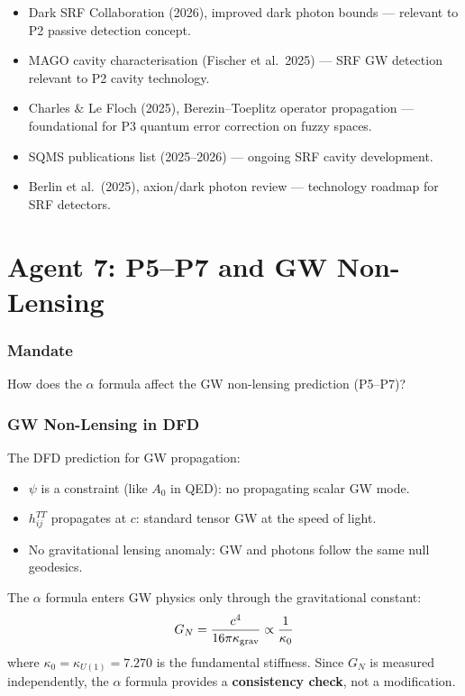 \documentclass[11pt,a4paper]{article}
\begin{document}
\begin{itemize}
\item Dark SRF Collaboration (2026), improved dark photon bounds --- relevant to P2 passive detection concept.
\item MAGO cavity characterisation (Fischer et al.\ 2025) --- SRF GW detection relevant to P2 cavity technology.
\item Charles \& Le Floch (2025), Berezin--Toeplitz operator propagation --- foundational for P3 quantum error correction on fuzzy spaces.
\item SQMS publications list (2025--2026) --- ongoing SRF cavity development.
\item Berlin et al.\ (2025), axion/dark photon review --- technology roadmap for SRF detectors.
\end{itemize}


\part{Agent 7: P5--P7 and GW Non-Lensing}
\label{part:agent7}

\section{Mandate}
How does the $\alpha$ formula affect the GW non-lensing prediction (P5--P7)?

\section{GW Non-Lensing in DFD}

The DFD prediction for GW propagation:
\begin{itemize}
\item $\psi$ is a constraint (like $A_0$ in QED): no propagating scalar GW mode.
\item $h_{ij}^{TT}$ propagates at $c$: standard tensor GW at the speed of light.
\item No gravitational lensing anomaly: GW and photons follow the same null geodesics.
\end{itemize}

The $\alpha$ formula enters GW physics only through the gravitational constant:
\begin{equation}
G_N = \frac{c^4}{16\pi\kappa_{\rm grav}} \propto \frac{1}{\kappa_0}
\end{equation}
where $\kappa_0 = \kappa_{U(1)} = 7.270$ is the fundamental stiffness. Since $G_N$ is measured independently, the $\alpha$ formula provides a \textbf{consistency check}, not a modification.
\end{document}
